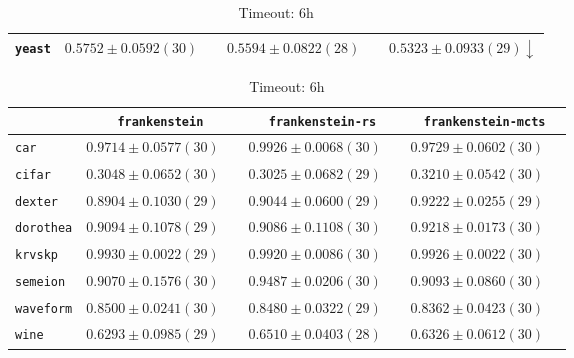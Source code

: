 \begin{table}[ht]
\begin{subtable}{\textwidth}
\begin{tabular}{l|ccc}
            \texttt{yeast} & $ \boldsymbol{0.5752} \pm 0.0592 (30) \phantom{\downarrow}$ & $ 0.5594 \pm 0.0822 (28) \phantom{\downarrow}$ & $ 0.5323 \pm 0.0933 (29) \downarrow$\\
            \hline
        \end{tabular}
    \end{subtable}
    \par\bigskip
    \begin{subtable}{\textwidth}
        \centering
        \caption{Timeout: 6h}
        \begin{tabular}{l|ccc}
            & \texttt{frankenstein}  & \texttt{frankenstein-rs}  & \texttt{frankenstein-mcts} \\
            \hline
            \texttt{car} & $ 0.9714 \pm 0.0577 (30) \phantom{\downarrow}$ & $ \boldsymbol{0.9926} \pm 0.0068 (30) \phantom{\downarrow}$ & $ 0.9729 \pm 0.0602 (30) \phantom{\downarrow}$\\
            \texttt{cifar} & $ 0.3048 \pm 0.0652 (30) \phantom{\downarrow}$ & $ 0.3025 \pm 0.0682 (29) \phantom{\downarrow}$ & $ \boldsymbol{0.3210} \pm 0.0542 (30) \phantom{\downarrow}$\\
            \texttt{dexter} & $ 0.8904 \pm 0.1030 (29) \phantom{\downarrow}$ & $ 0.9044 \pm 0.0600 (29) \phantom{\downarrow}$ & $ \boldsymbol{0.9222} \pm 0.0255 (29) \phantom{\downarrow}$\\
            \texttt{dorothea} & $ 0.9094 \pm 0.1078 (29) \phantom{\downarrow}$ & $ 0.9086 \pm 0.1108 (30) \phantom{\downarrow}$ & $ \boldsymbol{0.9218} \pm 0.0173 (30) \phantom{\downarrow}$\\
            \texttt{krvskp} & $ \boldsymbol{0.9930} \pm 0.0022 (29) \phantom{\downarrow}$ & $ 0.9920 \pm 0.0086 (30) \phantom{\downarrow}$ & $ 0.9926 \pm 0.0022 (30) \phantom{\downarrow}$\\
            \texttt{semeion} & $ 0.9070 \pm 0.1576 (30) \phantom{\downarrow}$ & $ \boldsymbol{0.9487} \pm 0.0206 (30) \phantom{\downarrow}$ & $ 0.9093 \pm 0.0860 (30) \phantom{\downarrow}$\\
            \texttt{waveform} & $ \boldsymbol{0.8500} \pm 0.0241 (30) \phantom{\downarrow}$ & $ 0.8480 \pm 0.0322 (29) \phantom{\downarrow}$ & $ 0.8362 \pm 0.0423 (30) \phantom{\downarrow}$\\
            \texttt{wine} & $ 0.6293 \pm 0.0985 (29) \phantom{\downarrow}$ & $ \boldsymbol{0.6510} \pm 0.0403 (28) \phantom{\downarrow}$ & $ 0.6326 \pm 0.0612 (30) \phantom{\downarrow}$\\

\end{tabular}
\end{subtable}
\end{table}
